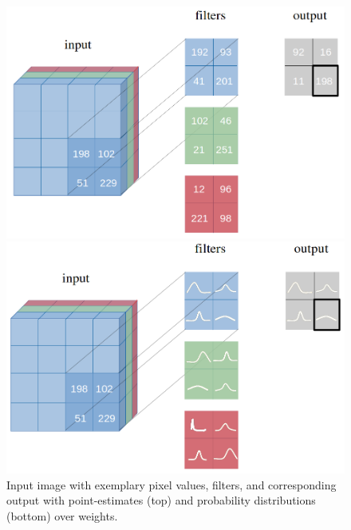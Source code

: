\begin{figure}[H] 
\centering
\begin{minipage}{.4\textwidth}
\centering
\includegraphics[width=\linewidth]{Chapter4/Figs/filter_scalars.png}
\end{minipage}
%
\begin{minipage}{.4\textwidth}
\centering
\includegraphics[width=\linewidth]{Chapter4/Figs/CNNwithdist.png}
\end{minipage}
\caption{Input image with exemplary pixel values, filters, and corresponding output with point-estimates (top) and probability distributions (bottom) over weights.}
\label{fig:filter_scalar}
\end{figure} 
%
